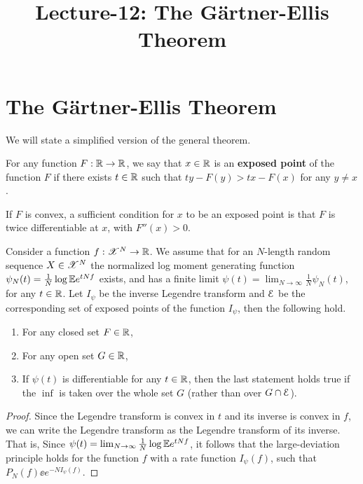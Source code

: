 \documentclass[letterpaper,english,10pt]{article}
\title{Lecture-12: The G\"{a}rtner-Ellis Theorem}
\begin{document}
\maketitle
\section{The G\"{a}rtner-Ellis Theorem}
We will state a simplified version of the general theorem. 
\begin{defn} 
For any function $F: \mathbb{R} \to \mathbb{R}$, we say that $x \in \mathbb{R}$ is an \textbf{exposed point} of the function $F$ if there exists $t \in \mathbb{R}$ such that $ty- F(y)> tx -F(x)$ for any $y \neq x$. 
\end{defn}
If $F$ is convex, a sufficient condition for $x$ to be an exposed point is that $F$ is twice differentiable at $x$, with $F''(x) > 0$. 
\begin{thm} 
Consider a function $f: \mathscr{X}^N \to \mathbb{R}$. 
We assume that for an $N$-length random sequence $X \in \mathscr{X}^N$ the normalized log moment generating function $\psi_N(t) = \frac{1}{N}\log\mathbb{E} e^{tNf}$ exists, and has a finite limit $\psi(t) = \lim_{N\to\infty}\frac{1}{N}\psi_N(t)$, 
for any $t \in \mathbb{R}$.  
Let $I_\psi$ be the inverse Legendre transform and $\mathcal{E}$ be the corresponding set of exposed points of the function $I_\psi$, 
then the following hold. 
\begin{enumerate}
\item For any closed set $F \in \mathbb{R}$, 
\item 
For any open set $G \in \mathbb{R}$, 
\item  If $\psi(t)$ is differentiable for any $t \in \mathbb{R}$, then the last statement holds true if the $\inf$ is taken over the whole set $G$ (rather than over $G\cap \mathcal{E}$).
\end{enumerate}
\end{thm}
\begin{proof} 
Since the Legendre transform is convex in $t$ and its inverse is convex in $f$, 
we can write the Legendre transform as the Legendre transform of its inverse. 
That is, 
Since $\psi(t) = \lim_{N \to \infty} \frac{1}{N}\log\mathbb{E} e^{tNf}$, it follows that the large-deviation principle holds for the function $f$ with a rate function $I_\psi(f)$, such that $P_N(f) \ee e^{-N I_\psi(f)}$.
\end{proof}
\end{document}
